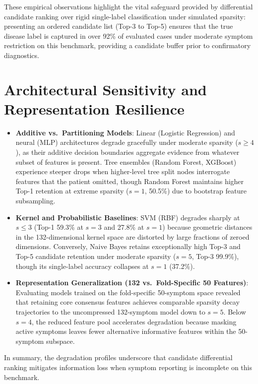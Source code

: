 These empirical observations highlight the vital safeguard provided by differential candidate ranking over rigid single-label classification under simulated sparsity: presenting an ordered candidate list (Top-3 to Top-5) ensures that the true disease label is captured in over 92\% of evaluated cases under moderate symptom restriction on this benchmark, providing a candidate buffer prior to confirmatory diagnostics.

\section{Architectural Sensitivity and Representation Resilience}
\label{sec:arch_sensitivity}
\begin{itemize}
    \item \textbf{Additive vs.\ Partitioning Models}: Linear (Logistic Regression) and neural (MLP) architectures degrade gracefully under moderate sparsity ($s \ge 4$), as their additive decision boundaries aggregate evidence from whatever subset of features is present. Tree ensembles (Random Forest, XGBoost) experience steeper drops when higher-level tree split nodes interrogate features that the patient omitted, though Random Forest maintains higher Top-1 retention at extreme sparsity ($s=1$, 50.5\%) due to bootstrap feature subsampling.
    \item \textbf{Kernel and Probabilistic Baselines}: SVM (RBF) degrades sharply at $s \le 3$ (Top-1 59.3\% at $s=3$ and 27.8\% at $s=1$) because geometric distances in the 132-dimensional kernel space are distorted by large fractions of zeroed dimensions. Conversely, Naive Bayes retains exceptionally high Top-3 and Top-5 candidate retention under moderate sparsity ($s=5$, Top-3 99.9\%), though its single-label accuracy collapses at $s=1$ (37.2\%).
    \item \textbf{Representation Generalization (132 vs.\ Fold-Specific 50 Features)}: Evaluating models trained on the fold-specific 50-symptom space revealed that retaining core consensus features achieves comparable sparsity decay trajectories to the uncompressed 132-symptom model down to $s=5$. Below $s=4$, the reduced feature pool accelerates degradation because masking active symptoms leaves fewer alternative informative features within the 50-symptom subspace.
\end{itemize}

In summary, the degradation profiles underscore that candidate differential ranking mitigates information loss when symptom reporting is incomplete on this benchmark.
